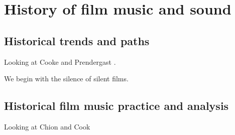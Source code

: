 
\chapter{History of film music and sound}
\label{history}

\section{Historical trends and paths}
Looking at Cooke \citeyearpar{cooke2008history} and Prendergast \citeyearpar{prendergast1992film}.

We  begin with the silence of silent films.  


\section{Historical film music practice and analysis}

Looking at Chion \citeyearpar{chion1990} and Cook \citeyearpar{cook1998analysing}
